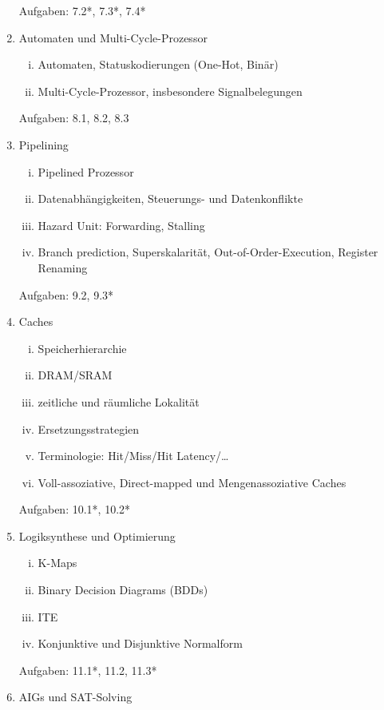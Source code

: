 \documentclass{article}
\begin{document}
\begin{enumerate}
\begin{enumerate}[i.]
          \end{enumerate}
          Aufgaben: 7.2*, 7.3*, 7.4*
    \item Automaten und Multi-Cycle-Prozessor
          \begin{enumerate}[i.]
              \item Automaten, Statuskodierungen (One-Hot, Binär)
              \item Multi-Cycle-Prozessor, insbesondere Signalbelegungen
          \end{enumerate}
          Aufgaben: 8.1, 8.2, 8.3
    \item Pipelining
          \begin{enumerate}[i.]
              \item Pipelined Prozessor
              \item Datenabhängigkeiten, Steuerungs- und Datenkonflikte
              \item Hazard Unit: Forwarding, Stalling
              \item Branch prediction, Superskalarität, Out-of-Order-Execution, Register Renaming
          \end{enumerate}
          Aufgaben: 9.2, 9.3*
    \item Caches
          \begin{enumerate}[i.]
              \item Speicherhierarchie
              \item DRAM/SRAM
              \item zeitliche und räumliche Lokalität
              \item Ersetzungsstrategien
              \item Terminologie: Hit/Miss/Hit Latency/\ldots
              \item Voll-assoziative, Direct-mapped und Mengenassoziative Caches
          \end{enumerate}
          Aufgaben: 10.1*, 10.2*
    \item Logiksynthese und Optimierung
          \begin{enumerate}[i.]
              \item K-Maps 
              \item Binary Decision Diagrams (BDDs)
              \item ITE
              \item Konjunktive und Disjunktive Normalform
          \end{enumerate}
          Aufgaben: 11.1*, 11.2, 11.3*
    \item AIGs und SAT-Solving

\end{enumerate}
\end{document}
